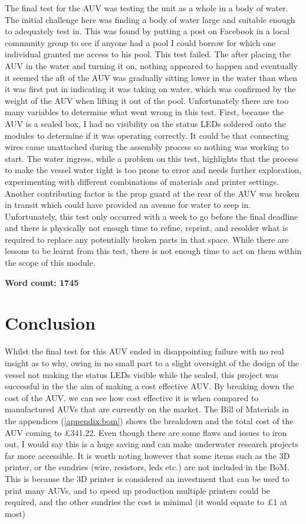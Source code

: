 \documentclass[11pt,a4paper,titlepage]{report}
\begin{document}
	The final test for the AUV was testing the unit as a whole in a body of water. The initial challenge here was finding a body of water large and suitable enough to adequately test in. This was found by putting a post on Facebook in a local community group to see if anyone had a pool I could borrow for which one individual granted me access to his pool. This test failed. The after placing the AUV in the water and turning it on, nothing appeared to happen and eventually it seemed the aft of the AUV was gradually sitting lower in the water than when it was first put in indicating it was taking on water, which was confirmed by the weight of the AUV when lifting it out of the pool. Unfortunately there are too many variables to determine what went wrong in this test. First, because the AUV is a sealed box, I had no visibility on the status LEDs soldered onto the modules to determine if it was operating correctly. It could be that connecting wires came unattached during the assembly process so nothing was working to start. The water ingress, while a problem on this test, highlights that the process to make the vessel water tight is too prone to error and needs further exploration, experimenting with different combinations of materials and printer settings. Another contributing factor is the prop guard at the rear of the AUV was broken in transit which could have provided an avenue for water to seep in. Unfortunately, this test only occurred with a week to go before the final deadline and there is physically not enough time to refine, reprint, and resolder what is required to replace any potentially broken parts in that space. While there are lessons to be learnt from this test, there is not enough time to act on them within the scope of this module.   
	
	\textbf{Word count: 1745}
	
	\chapter*{Conclusion}
	
	Whilst the final test for this AUV ended in disappointing failure with no real insight as to why, owing in no small part to a slight oversight of the design of the vessel not making the status LEDs visible while the sealed, this project was successful in the the aim of making a cost effective AUV. By breaking down the cost of the AUV, we can see how cost effective it is when compared to manufactured AUVs that are currently on the market. The Bill of Materials in the appendices (\ref{appendix:bom}) shows the breakdown and the total cost of the AUV coming to £341.22. Even though there are some flaws and issues to iron out, I would say this is a huge saving and can make underwater research projects far more accessible. It is worth noting however that some items such as the 3D printer, or the sundries (wire, resistors, leds etc.) are not included in the BoM. This is because the 3D printer is considered an investment that can be used to print many AUVs, and to speed up production multiple printers could be required, and the other sundries the cost is minimal (it would equate to £1 at most)
	
\end{document}
